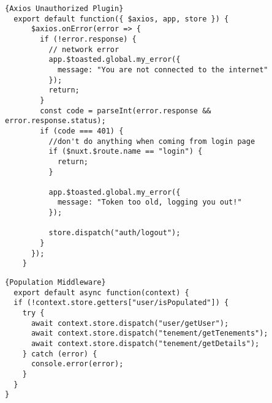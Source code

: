 \begin{lstlisting}[caption=Axios Unauthorized Plugin, captionpos=b, style=htmlcssjs, label=unauthorized]{Axios Unauthorized Plugin}
  export default function({ $axios, app, store }) {
      $axios.onError(error => {
        if (!error.response) {
          // network error
          app.$toasted.global.my_error({
            message: "You are not connected to the internet"
          });
          return;
        }
        const code = parseInt(error.response && error.response.status);
        if (code === 401) {
          //don't do anything when coming from login page
          if ($nuxt.$route.name == "login") {
            return;
          }
    
          app.$toasted.global.my_error({
            message: "Token too old, logging you out!"
          });
    
          store.dispatch("auth/logout");
        }
      });
    }
\end{lstlisting}


\begin{lstlisting}[caption=Population Middleware, captionpos=b, style=htmlcssjs, label=popmiddleware]{Population Middleware}
  export default async function(context) {
  if (!context.store.getters["user/isPopulated"]) {
    try {
      await context.store.dispatch("user/getUser");
      await context.store.dispatch("tenement/getTenements");
      await context.store.dispatch("tenement/getDetails");
    } catch (error) {
      console.error(error);
    }
  }
}
\end{lstlisting}

